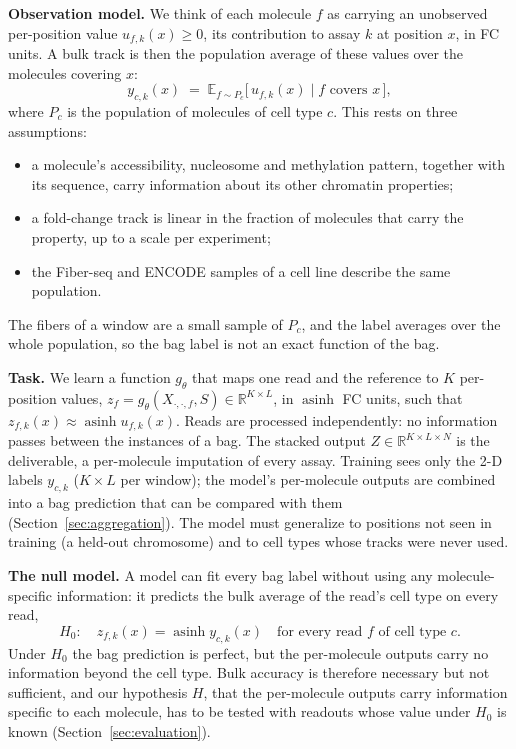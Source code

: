 \documentclass[acmtog,nonacm]{acmart}   %
\begin{document}
\textbf{Observation model.} We think of each molecule $f$ as carrying an unobserved per-position value
$u_{f,k}(x)\ge0$, its contribution to assay $k$ at position $x$, in FC units. A bulk track is then the population
average of these values over the molecules covering $x$:
\begin{equation}
y_{c,k}(x)\;=\;\mathbb{E}_{f\sim P_c}\big[\,u_{f,k}(x)\;\big|\;f \text{ covers } x\,\big],
\label{eq:obs}
\end{equation}
where $P_c$ is the population of molecules of cell type $c$. This rests on three assumptions:
\begin{itemize}
  \item[(A1)] a molecule's accessibility, nucleosome and methylation pattern, together with its sequence, carry
    information about its other chromatin properties;
  \item[(A2)] a fold-change track is linear in the fraction of molecules that carry the property, up to a scale
    per experiment;
  \item[(A3)] the Fiber-seq and ENCODE samples of a cell line describe the same population.
\end{itemize}
The fibers of a window are a small sample of $P_c$, and the label averages over the whole population, so the bag
label is not an exact function of the bag.

\textbf{Task.} We learn a function $g_\theta$ that maps one read and the reference to $K$ per-position values,
$z_f=g_\theta(X_{\cdot,\cdot,f},S)\in\mathbb{R}^{K\times L}$, in $\operatorname{asinh}$ FC units, such that
$z_{f,k}(x)\approx\operatorname{asinh}u_{f,k}(x)$. Reads are processed independently: no information passes
between the instances of a bag. The stacked output $Z\in\mathbb{R}^{K\times L\times N}$ is the deliverable, a
per-molecule imputation of every assay. Training sees only the 2-D labels $y_{c,k}$ ($K\times L$ per window); the
model's per-molecule outputs are combined into a bag prediction that can be compared with them
(Section~\ref{sec:aggregation}). The model must generalize to positions not seen in training (a held-out
chromosome) and to cell types whose tracks were never used.

\textbf{The null model.} A model can fit every bag label without using any molecule-specific information: it
predicts the bulk average of the read's cell type on every read,
\begin{equation}
H_0:\quad z_{f,k}(x)=\operatorname{asinh}y_{c,k}(x)\quad\text{for every read } f \text{ of cell type } c.
\label{eq:null}
\end{equation}
Under $H_0$ the bag prediction is perfect, but the per-molecule outputs carry no information beyond the cell type.
Bulk accuracy is therefore necessary but not sufficient, and our hypothesis $H$, that the per-molecule outputs carry
information specific to each molecule, has to be tested with readouts whose value under $H_0$ is known
(Section~\ref{sec:evaluation}).
\end{document}
